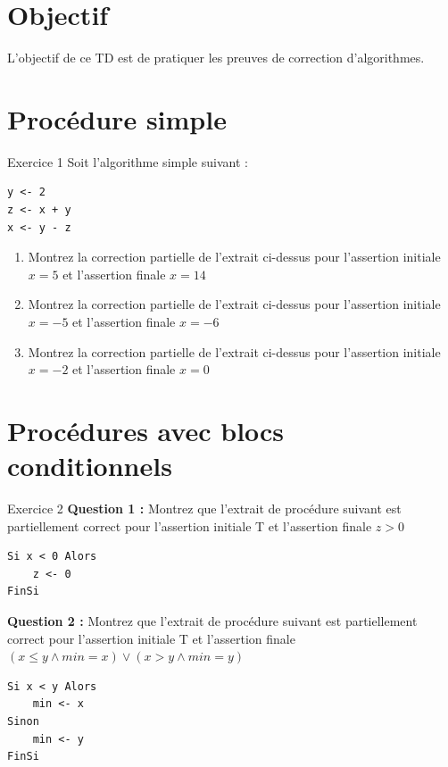 \documentclass[a4paper,11pt]{article}
\begin{document}
\section*{Objectif}
L'objectif de ce TD est de pratiquer les preuves de correction d'algorithmes.

\section{Procédure simple}

\begin{exercisebox}{Exercice 1}
Soit l'algorithme simple suivant :
\begin{lstlisting}
y <- 2
z <- x + y
x <- y - z
\end{lstlisting}

\begin{enumerate}
    \item Montrez la correction partielle de l'extrait ci-dessus pour l'assertion initiale $x = 5$ et l'assertion finale $x = 14$
    \item Montrez la correction partielle de l'extrait ci-dessus pour l'assertion initiale $x = -5$ et l'assertion finale $x = -6$
    \item Montrez la correction partielle de l'extrait ci-dessus pour l'assertion initiale $x = -2$ et l'assertion finale $x = 0$
\end{enumerate}
\end{exercisebox}

\section{Procédures avec blocs conditionnels}

\begin{exercisebox}{Exercice 2}
\textbf{Question 1 :} Montrez que l'extrait de procédure suivant est partiellement correct pour l'assertion initiale T et l'assertion finale $z > 0$

\begin{lstlisting}
Si x < 0 Alors
    z <- 0
FinSi
\end{lstlisting}

\textbf{Question 2 :} Montrez que l'extrait de procédure suivant est partiellement correct pour l'assertion initiale T et l'assertion finale $(x \leq y \wedge min = x) \vee (x > y \wedge min = y)$

\begin{lstlisting}
Si x < y Alors
    min <- x
Sinon
    min <- y
FinSi
\end{lstlisting}
\end{exercisebox}
\end{document}
